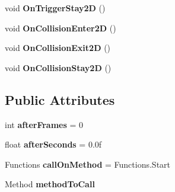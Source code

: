 \begin{DoxyCompactItemize}
\mbox{\label{class_unity_test_1_1_call_testing_a812b7c75ef159d5280b0d8972a5abc70}} 
void {\bfseries On\+Trigger\+Stay2D} ()
\item 
\mbox{\label{class_unity_test_1_1_call_testing_a9279d612c940b7769da0261d5aa32403}} 
void {\bfseries On\+Collision\+Enter2D} ()
\item 
\mbox{\label{class_unity_test_1_1_call_testing_a50270639306fb4e4e7348573ebdc4aeb}} 
void {\bfseries On\+Collision\+Exit2D} ()
\item 
\mbox{\label{class_unity_test_1_1_call_testing_ae6f91b6d0b4dfdfa31fdcf46061e7083}} 
void {\bfseries On\+Collision\+Stay2D} ()
\end{DoxyCompactItemize}
\subsection*{Public Attributes}
\begin{DoxyCompactItemize}
\item 
\mbox{\label{class_unity_test_1_1_call_testing_a9e2e80ff65223a81b70f5bce78e61ef1}} 
int {\bfseries after\+Frames} = 0
\item 
\mbox{\label{class_unity_test_1_1_call_testing_a53ed20e99659015da00bd12fa0cbe231}} 
float {\bfseries after\+Seconds} = 0.\+0f
\item 
\mbox{\label{class_unity_test_1_1_call_testing_a0c1656c32cdee98ce010134377318d28}} 
Functions {\bfseries call\+On\+Method} = Functions.\+Start
\item 
\mbox{\label{class_unity_test_1_1_call_testing_a2edea0139d99cfe943abff47adfbeecd}} 
Method {\bfseries method\+To\+Call}
\end{DoxyCompactItemize}
